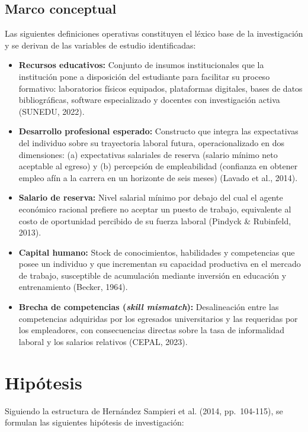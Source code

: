 \documentclass[11pt, a4paper]{article}
\begin{document}
\subsection{Marco conceptual}

Las siguientes definiciones operativas constituyen el léxico base de la investigación y se derivan de las variables de estudio identificadas:

\begin{itemize}
    \item \textbf{Recursos educativos:} Conjunto de insumos institucionales que la institución pone a disposición del estudiante para facilitar su proceso formativo: laboratorios físicos equipados, plataformas digitales, bases de datos bibliográficas, software especializado y docentes con investigación activa (SUNEDU, 2022).
    \item \textbf{Desarrollo profesional esperado:} Constructo que integra las expectativas del individuo sobre su trayectoria laboral futura, operacionalizado en dos dimensiones: (a) expectativas salariales de reserva (salario mínimo neto aceptable al egreso) y (b) percepción de empleabilidad (confianza en obtener empleo afín a la carrera en un horizonte de seis meses) (Lavado et al., 2014).
    \item \textbf{Salario de reserva:} Nivel salarial mínimo por debajo del cual el agente económico racional prefiere no aceptar un puesto de trabajo, equivalente al costo de oportunidad percibido de su fuerza laboral (Pindyck \& Rubinfeld, 2013).
    \item \textbf{Capital humano:} Stock de conocimientos, habilidades y competencias que posee un individuo y que incrementan su capacidad productiva en el mercado de trabajo, susceptible de acumulación mediante inversión en educación y entrenamiento (Becker, 1964).
    \item \textbf{Brecha de competencias (\textit{skill mismatch}):} Desalineación entre las competencias adquiridas por los egresados universitarios y las requeridas por los empleadores, con consecuencias directas sobre la tasa de informalidad laboral y los salarios relativos (CEPAL, 2023).
\end{itemize}

\section{Hipótesis}

Siguiendo la estructura de Hernández Sampieri et al. (2014, pp.~104-115), se formulan las siguientes hipótesis de investigación:
\end{document}
